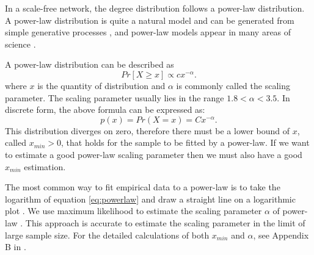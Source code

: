 \documentclass[paper]{ieice}
\begin{document}
In a scale-free network, the degree distribution follows a power-law distribution.   
A power-law distribution is quite a natural model and can be generated from simple generative processes \cite{mitzenmacher2004brief}, and power-law models appear in many areas of science \cite{clauset2009power} \cite{mitzenmacher2004brief}. 

A power-law distribution can be described as
\begin{equation}
Pr[X\ge x] \propto cx^{-\alpha}.
\label{eq:powerlaw}
\end{equation}
where $x$ is the quantity of distribution and $\alpha$ is commonly called the scaling parameter. 
The scaling parameter usually lies in the range $1.8<\alpha<3.5$.
In discrete form, the above formula can be expressed as:
\begin{equation}
p(x) = Pr(X=x) = Cx^{- \alpha}.
\label{eq:powerlawdiscrete}
\end{equation}
This distribution diverges on zero, therefore there must be a lower bound of $x$, called $x_{min} > 0$, that holds for the sample to be fitted by a power-law. 
If we want to estimate a good power-law scaling parameter then we must also have a good $x_{min}$ estimation. 


The most common way to fit empirical data to a power-law is to take the logarithm of equation \ref{eq:powerlaw} and draw a straight line on a logarithmic plot \cite{mitzenmacher2004brief}.  
We use maximum likelihood to estimate the scaling parameter $\alpha$ of power-law \cite{clauset2009power}.  
This approach is accurate to estimate the scaling parameter in the limit of large sample size. 
For the detailed calculations of both $x_{min}$ and $\alpha$, see Appendix B in \cite{clauset2009power}.
\end{document}
